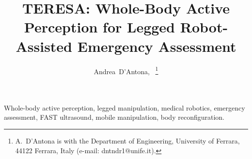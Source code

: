 \documentclass[journal]{IEEEtran}
\title{TERESA: Whole-Body Active Perception for Legged
       Robot-Assisted Emergency Assessment}
\author{Andrea~D'Antona,~\IEEEmembership{}
                \thanks{A.~D'Antona is with the Department of Engineering,
                University of Ferrara, 44122 Ferrara, Italy
                (e-mail: dntndr1@unife.it).}}
\begin{document}
\maketitle





\begin{IEEEkeywords}
Whole-body active perception, legged manipulation, medical robotics,
emergency assessment, FAST ultrasound, mobile manipulation,
body reconfiguration.
\end{IEEEkeywords}













\end{document}

